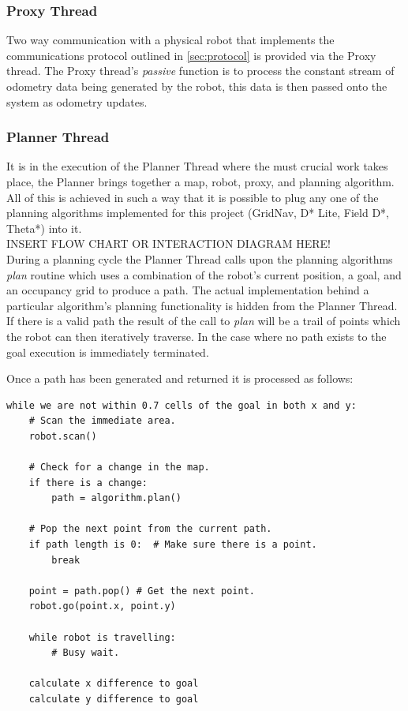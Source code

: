 \subsubsection*{Proxy Thread}
\noindent
Two way communication with a physical robot that implements the communications protocol outlined in \ref{sec:protocol} is provided via the Proxy thread. The Proxy thread's \textit{passive} function is to process the constant stream of odometry data being generated by the robot, this data is then passed onto the system as odometry updates. 

\subsubsection*{Planner Thread}
\noindent
It is in the execution of the Planner Thread where the must crucial work takes place, the Planner brings together a map, robot, proxy, and planning algorithm. All of this is achieved in such a way that it is possible to plug any one of the planning algorithms implemented for this project (GridNav, D* Lite, Field D*, Theta*) into it. \\

\noindent
INSERT FLOW CHART OR INTERACTION DIAGRAM HERE! \\

\noindent
During a planning cycle the Planner Thread calls upon the planning algorithms \textit{plan} routine which uses a combination of the robot's current position, a goal, and an occupancy grid to produce a path. The actual implementation behind a particular algorithm's planning functionality is hidden from the Planner Thread. If there is a valid path the result of the call to \textit{plan} will be a trail of points which the robot can then iteratively traverse. In the case where no path exists to the goal execution is immediately terminated. \\

\newpage

\noindent
Once a path has been generated and returned it is processed as follows: \\

\begin{lstlisting}
while we are not within 0.7 cells of the goal in both x and y:
	# Scan the immediate area.
	robot.scan()
	
	# Check for a change in the map.
	if there is a change:
		path = algorithm.plan()
		
	# Pop the next point from the current path.
	if path length is 0:  # Make sure there is a point.
		break

	point = path.pop() # Get the next point.
	robot.go(point.x, point.y)
	
	while robot is travelling:
		# Busy wait.

	calculate x difference to goal
	calculate y difference to goal
\end{lstlisting}

